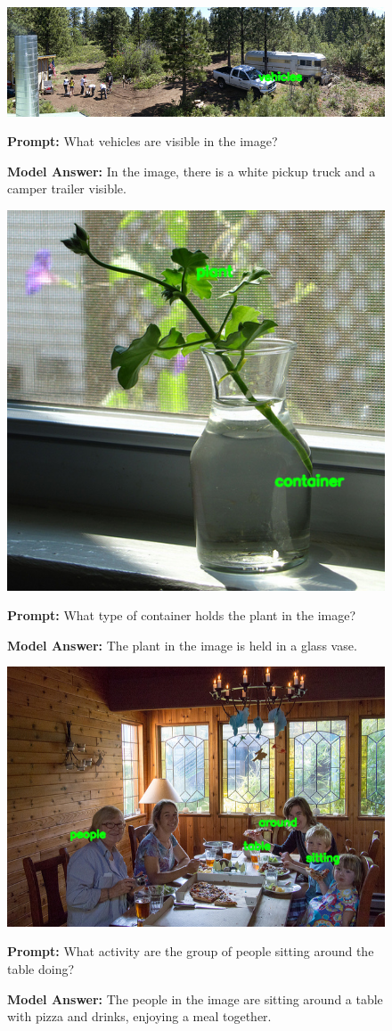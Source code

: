 \documentclass[11pt]{article}
\begin{document}
\begin{figure}[H]
    \centering
    \includegraphics[width=0.9\linewidth]{reordering_263.png}\par
    \vspace{1em}
    \raggedright
    \textbf{Prompt:} What vehicles are visible in the image?
    
    \textbf{Model Answer:} In the image, there is a white pickup truck and a camper trailer visible.
    \label{fig:qwen_loss_plot}
\end{figure}


\begin{figure}[H]
    \centering
    \includegraphics[width=0.5\linewidth]{reordering_301.png}\par
    \vspace{1em}
    \raggedright
    \textbf{Prompt:} What type of container holds the plant in the image?
    
    \textbf{Model Answer:} The plant in the image is held in a glass vase.
\end{figure}

\begin{figure}[H]
    \centering
    \includegraphics[width=0.6\linewidth]{reordering_52.png}\par
    \vspace{1em}
    \raggedright
    \textbf{Prompt:} What activity are the group of people sitting around the table doing?

    \textbf{Model Answer:} The people in the image are sitting around a table with pizza and drinks, enjoying a meal together.
\end{figure}
\end{document}
